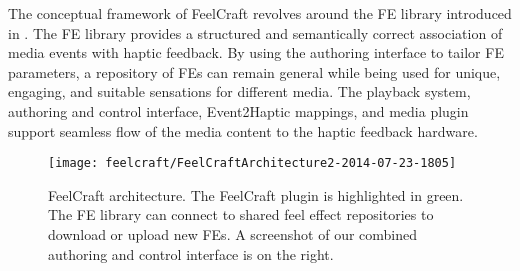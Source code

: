 The conceptual framework of FeelCraft revolves around the FE library introduced in \cite{Israr2014}.
The FE library provides a structured and semantically correct association of media events with haptic feedback.
By using the authoring interface to tailor FE parameters, a repository of FEs can remain general while being used for unique, engaging, and suitable sensations for different media.
The playback system, authoring and control interface, Event2Haptic mappings, and media plugin support seamless flow of the media content to the haptic feedback hardware.

\begin{figure}[htbp] %
   \centering
   \texttt{[image: feelcraft/FeelCraftArchitecture2-2014-07-23-1805]} 
   \caption{FeelCraft architecture. The FeelCraft plugin is highlighted in green. The FE library can connect to shared feel effect repositories to download or upload new FEs. A screenshot of our combined authoring and control interface is on the right.}
   \label{fig:feelcraft:architecture}
\end{figure}

